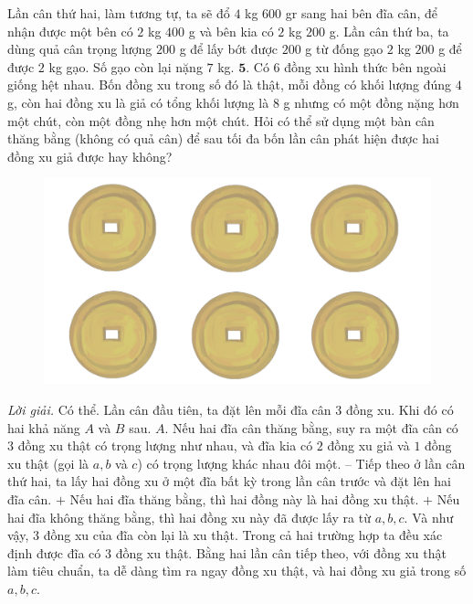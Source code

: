 \begin{multicols}{2}
	Lần cân thứ hai, làm tương tự, ta sẽ  đổ $4$ kg $600$ gr sang hai bên đĩa cân, để nhận được một bên có $2$ kg $400$ g và bên kia có $2$ kg $200$ g. Lần cân thứ ba, ta dùng quả cân trọng lượng $200$ g để lấy bớt được $200$ g từ đống gạo $2$ kg $200$ g để được $2$ kg gạo. Số gạo còn lại nặng $7$ kg.
	\vskip 0.1cm
	$\pmb{5.}$ 	Có $6$ đồng xu hình thức bên ngoài giống hệt nhau. Bốn đồng xu trong số đó là thật, mỗi đồng có khối lượng đúng $4$ g, còn hai đồng xu là giả có tổng khối lượng là $8$ g nhưng có một đồng nặng hơn một chút, còn một đồng nhẹ hơn một chút. Hỏi có thể sử dụng một bàn cân thăng bằng (không có quả cân) để sau tối đa bốn lần cân phát hiện được hai đồng xu giả được hay không?
	\begin{figure}[H]
		\centering
		\vspace*{-5pt}
		\captionsetup{labelformat= empty, justification=centering}
		\includegraphics[width=1\linewidth]{Hinh5}
		\vspace*{-20pt}
	\end{figure}
	\textit{Lời giải.} Có thể. 
	\vskip 0.1cm
	Lần cân đầu tiên, ta đặt lên mỗi đĩa cân $3$ đồng xu. Khi đó có hai khả năng $A$ và $B$ sau.
	\vskip 0.1cm
	$A.$ Nếu hai đĩa cân thăng bằng, suy ra một đĩa cân có $3$ đồng xu thật có trọng lượng như nhau, và đĩa kia có $2$ đồng xu giả và $1$ đồng xu thật (gọi là $a,b$ và $c$) có trọng lượng khác nhau đôi một. 
	\vskip 0.1cm
	-- Tiếp theo ở lần cân thứ hai, ta lấy hai đồng xu ở một đĩa bất kỳ trong lần cân trước và đặt lên hai đĩa cân. 
	\vskip 0.1cm
	$+$ Nếu hai đĩa thăng bằng, thì hai đồng này là hai đồng xu thật. 
	\vskip 0.1cm
	$+$ Nếu hai đĩa không thăng bằng, thì hai đồng xu này đã được lấy ra từ $a, b, c$. Và như vậy, $3$ đồng xu của đĩa còn lại là xu thật.
	\vskip 0.1cm 
	Trong cả hai trường hợp ta đều xác định được đĩa có $3$ đồng xu thật. Bằng hai lần cân tiếp theo, với đồng xu thật làm tiêu chuẩn, ta dễ dàng tìm ra ngay đồng xu thật, và hai đồng xu giả trong số $a,b,c$.

\end{multicols}
